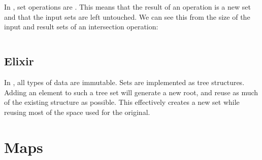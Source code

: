 In , set operations are . This means that the result of an operation is a new set and that the input sets are left untouched. We can see this from the size of the input and result sets of an intersection operation:

\inputminted[]{pycon}{../src/python/collections/sets/repl_version.txt}

\subsection{Elixir}

In , all types of data are immutable. Sets are implemented as tree structures. Adding an element to such a tree set will generate a new root, and reuse as much of the existing structure as possible. This effectively creates a new set while reusing most of the space used for the original.

\section{Maps}
\label{collections:maps}


